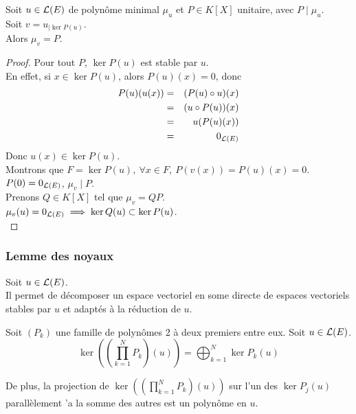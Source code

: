 \begin{coro}
	Soit $u \in \mathcal{L}(E)$ de polynôme minimal $\mu_u$ et $P \in K[X]$ unitaire, avec $P \mid \mu_u$.\\
	Soit $v = u_{| \ker P(u)}$.\\ %
	Alors $\mu_v = P$.
\end{coro}


\begin{proof}
	Pour tout $P$, $\ker P(u) $ est stable par $u$.\\
	En effet, si $x \in \ker P(u)$, alors $P(u)(x) = 0$, donc
	\begin{eqnarray*}
		P(u)(u(x)) &=& (P (u) \circ u)(x) \\
		&=& (u \circ P(u))(x) \\
		&=& u(P(u)(x)) \\
		&=& 0_{\mathcal{L}(E)}
	\end{eqnarray*}
	Donc $u(x) \in \ker P(u)$.\\ %

	Montrons que $F = \ker P(u), \ \forall x \in F, \ P(v(x)) = P(u)(x) = 0$.\\

	$P(0)=0_{\mathcal{L}(E)}$, $\mu_v \mid P$.\\
	Prenons $Q \in K[X]$ tel que $\mu_v = QP$.\\
	$\mu_v(u) = 0_{\mathcal{L}(E)} \implies \ker Q(u) \subset \ker P(u)$.\\
\end{proof}



\subsubsection{Lemme des noyaux}

Soit $u \in \mathcal{L}(E)$.\\
Il permet de décomposer un espace vectoriel en some directe de espaces vectoriels stables par $u$ et adaptés à la réduction de $u$.

\begin{lemma}
	Soit $(P_k)$ une famille de polynômes 2 à deux premiers entre eux.
	Soit $u \in \mathcal{L}(E)$.
	$$ \ker \left(\left(\prod_{k=1}^N P_k \right)(u)\right) = \bigoplus_{k=1}^N \ker P_k(u)$$

	De plus, la projection de $\ker \left(\left(\prod_{k=1}^N P_k \right)(u)\right)$ sur l'un des  $\ker P_j(u)$ parallèlement 'a la somme des autres est un polynôme en $u$.
\end{lemma}

